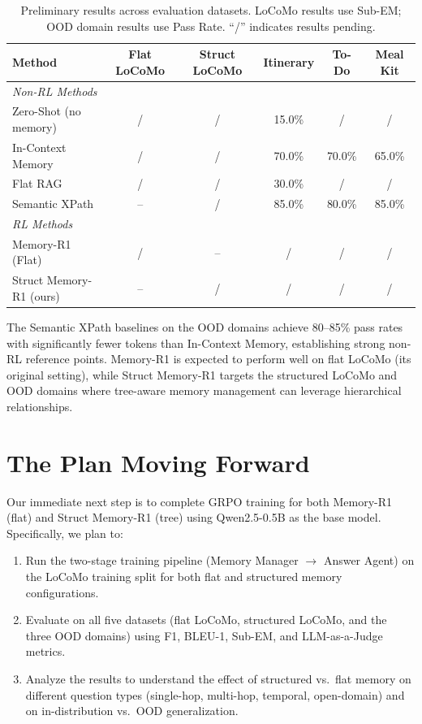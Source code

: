 \documentclass{article}
\theoremstyle{definition}
\begin{document}
\begin{table}[h]
\centering
\caption{Preliminary results across evaluation datasets. LoCoMo results use Sub-EM; OOD domain results use Pass Rate. ``/'' indicates results pending.}
\label{tab:preliminary}
\small
\begin{tabular}{lccccc}
\toprule
\textbf{Method} & \textbf{Flat LoCoMo} & \textbf{Struct LoCoMo} & \textbf{Itinerary} & \textbf{To-Do} & \textbf{Meal Kit} \\
\midrule
\multicolumn{6}{l}{\textit{Non-RL Methods}} \\
Zero-Shot (no memory) & / & / & 15.0\% & / & / \\
In-Context Memory & / & / & 70.0\% & 70.0\% & 65.0\% \\
Flat RAG & / & / & 30.0\% & / & / \\
Semantic XPath & -- & / & 85.0\% & 80.0\% & 85.0\% \\
\midrule
\multicolumn{6}{l}{\textit{RL Methods}} \\
Memory-R1 (Flat) & / & -- & / & / & / \\
Struct Memory-R1 (ours) & -- & / & / & / & / \\
\bottomrule
\end{tabular}
\end{table}

The Semantic XPath baselines on the OOD domains achieve 80--85\% pass rates with significantly fewer tokens than In-Context Memory, establishing strong non-RL reference points. Memory-R1 is expected to perform well on flat LoCoMo (its original setting), while Struct Memory-R1 targets the structured LoCoMo and OOD domains where tree-aware memory management can leverage hierarchical relationships.

\section{The Plan Moving Forward}

Our immediate next step is to complete GRPO training for both Memory-R1 (flat) and Struct Memory-R1 (tree) using Qwen2.5-0.5B as the base model. Specifically, we plan to:
\begin{enumerate}[nosep]
    \item Run the two-stage training pipeline (Memory Manager $\to$ Answer Agent) on the LoCoMo training split for both flat and structured memory configurations.
    \item Evaluate on all five datasets (flat LoCoMo, structured LoCoMo, and the three OOD domains) using F1, BLEU-1, Sub-EM, and LLM-as-a-Judge metrics.
    \item Analyze the results to understand the effect of structured vs.\ flat memory on different question types (single-hop, multi-hop, temporal, open-domain) and on in-distribution vs.\ OOD generalization.
\end{enumerate}



\end{document}
